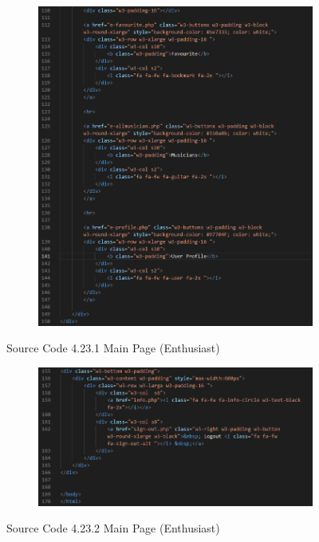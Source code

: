 \begin{enumerate}[1.]
\begin{figure}[h]
\begin{subfigure}[b]{0.6\textwidth}
            \label{fig:sub1}
        \end{subfigure}
        \hspace{0.04\textwidth}
        \begin{subfigure}[b]{0.6\textwidth}
            \centering
            \includegraphics[width=\textwidth]{mainmatter/images/frontend/code/emain2.png}
            \label{fig:sub2}
        \end{subfigure}
        \caption*{Source Code 4.23.1 Main Page (Enthusiast)}
        \label{fig:myfig62a}
    \end{figure}
    \begin{figure}[h]\ContinuedFloat
        \centering
        \begin{subfigure}[b]{0.7\textwidth}
            \centering
            \includegraphics[width=\textwidth]{mainmatter/images/frontend/code/emain3.png}
            \label{fig:sub3}
        \end{subfigure}
        \caption*{Source Code 4.23.2 Main Page (Enthusiast)}
        \label{fig:myfig62b}
    \end{figure}
    

\end{enumerate}
